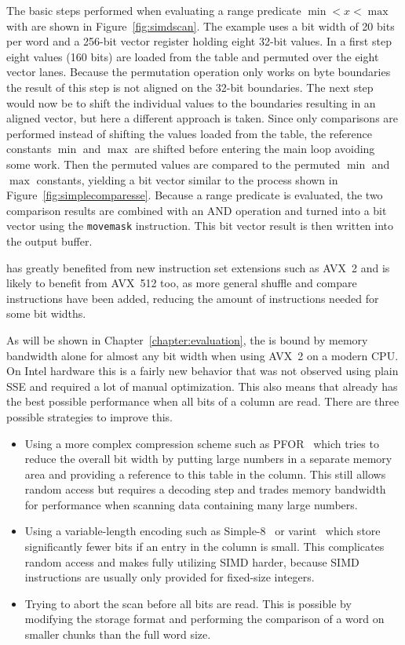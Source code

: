 The basic steps performed when evaluating a range predicate $\min < x < \max$
with \simdscan{} are shown in Figure~\ref{fig:simdscan}. The example uses a bit
width of 20 bits per word and a 256-bit vector register holding eight 32-bit
values.  In a first step eight values (160 bits) are loaded from the table and
permuted over the eight vector lanes. Because the permutation operation only
works on byte boundaries the result of this step is not aligned on the 32-bit
boundaries.  The next step would now be to shift the individual values to the
boundaries resulting in an aligned vector, but here a different approach is
taken. Since only comparisons are performed instead of shifting the values
loaded from the table, the reference constants $\min$ and $\max$ are shifted
before entering the main loop avoiding some work. Then the permuted values are
compared to the permuted $\min$ and $\max$ constants, yielding a bit vector
similar to the process shown in Figure~\ref{fig:simplecomparesse}. Because a
range predicate is evaluated, the two comparison results are combined with an AND
operation and turned into a bit vector using the \texttt{movemask} instruction.
This bit vector result is then written into the output buffer.

\simdscan{} has greatly benefited from new instruction set extensions such as
AVX~2 \cite{AVX2-Scan} and is likely to benefit from AVX~512 too, as more general
shuffle and compare instructions have been added, reducing the amount of
instructions needed for some bit widths.

As will be shown in Chapter~\ref{chapter:evaluation}, the \simdscan{} is bound by
memory bandwidth alone for almost any bit width when using AVX~2 on a modern
CPU. On Intel hardware this is a fairly new behavior that was not observed using
plain SSE \cite{AVX2-Scan} and required a lot of manual optimization. This also
means that \simdscan{} already has the best possible performance when all bits
of a column are read. There are three possible strategies to improve this.

\begin{itemize}
  \item Using a more complex compression scheme such as PFOR~\cite{PFOR} which
    tries to reduce the overall bit width by putting large numbers in a separate
    memory area and providing a reference to this table in the column. This
    still allows random access but requires a decoding step and trades
    memory bandwidth for performance when scanning data containing many large
    numbers.
  \item Using a variable-length encoding such as Simple-8~\cite{Simple8} or
    varint~\cite{varint} which store significantly fewer bits if an entry in the
    column is small. This complicates random access and makes fully utilizing
    SIMD harder, because SIMD instructions are usually only provided for
    fixed-size integers.
  \item Trying to abort the scan before all bits are read. This is possible by
    modifying the storage format and performing the comparison of a word on
    smaller chunks than the full word size.
\end{itemize}

